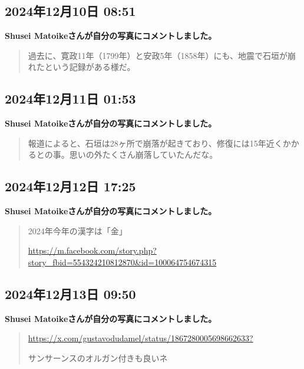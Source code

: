 \subsection*{2024年12月10日 08:51}

\textbf{Shusei Matoikeさんが自分の写真にコメントしました。}

\begin{quote}
過去に、寛政11年（1799年）と安政5年（1858年）にも、地震で石垣が崩れたという記録がある様だ。
\end{quote}

\subsection*{2024年12月11日 01:53}

\textbf{Shusei Matoikeさんが自分の写真にコメントしました。}

\begin{quote}
報道によると、石垣は28ヶ所で崩落が起きており、修復には15年近くかかるとの事。思いの外たくさん崩落していたんだな。
\end{quote}

\subsection*{2024年12月12日 17:25}

\textbf{Shusei Matoikeさんが自分の写真にコメントしました。}

\begin{quote}
2024年今年の漢字は「金」

\url{https://m.facebook.com/story.php?story_fbid=554324210812870&id=100064754674315}
\end{quote}

\subsection*{2024年12月13日 09:50}

\textbf{Shusei Matoikeさんが自分の写真にコメントしました。}

\begin{quote}
\url{https://x.com/gustavodudamel/status/1867280005698662633?}

サンサーンスのオルガン付きも良いネ
\end{quote}

